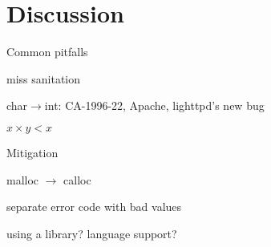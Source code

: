 \section{Discussion}
\label{s:disc}

Common pitfalls

miss sanitation

char$\to$int: 
CA-1996-22,
Apache,
lighttpd's new bug

$x \times y < x$

Mitigation

malloc $\to$ calloc

separate error code with bad values

using a library? language support?
